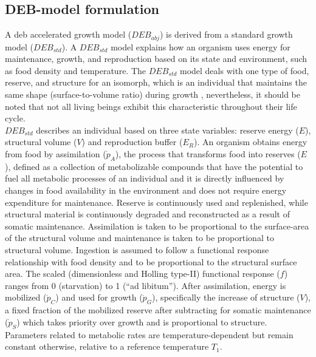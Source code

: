 \subsection{DEB-model formulation}\label{Chap4MethDEBformulation}

A \acrshort{deb} accelerated growth model ($DEB_{abj}$) is derived from a standard growth model ($DEB_{std}$). A $DEB_{std}$ model explains how an organism uses energy for maintenance, growth, and reproduction based on its state and environment, such as food density and temperature. The $DEB_{std}$ model deals with one type of food, reserve, and structure for an isomorph, which is an individual that maintains the same shape (surface-to-volume ratio) during growth \citep{Kooi2009}, nevertheless, it should be noted that not all living beings exhibit this characteristic throughout their life cycle.\\

$DEB_{std}$ describes an individual based on three state variables: reserve energy ($E$), structural volume ($V$) and reproduction buffer ($E_{R}$). An organism obtains energy from food by assimilation ($\dot{p}_{A}$), the process that transforms food into reserves ($E$), defined as a collection of metabolizable compounds that have the potential to fuel all metabolic processes of an individual and it is directly influenced by changes in food availability in the environment and does not require energy expenditure for maintenance. Reserve is continuously used and replenished, while structural material is continuously degraded and reconstructed as a result of somatic maintenance. Assimilation is taken to be proportional to the surface-area of the structural volume and maintenance is taken to be proportional to structural volume. Ingestion is assumed to follow a functional response relationship with food density and to be proportional to the structural surface area. The scaled (dimensionless and Holling type-II) functional response ($f$) ranges from 0 (starvation) to 1 (``ad libitum''). After assimilation, energy is mobilized ($\dot{p}_{C}$) and used for growth ($\dot{p}_{G}$), specifically the increase of structure ($V$), a fixed fraction of the mobilized reserve after subtracting for somatic maintenance ($\dot{p}_{S}$) which takes priority over growth and is proportional to structure. Parameters related to metabolic rates are temperature-dependent but remain constant otherwise, relative to a reference temperature $T_{1}$.\\

